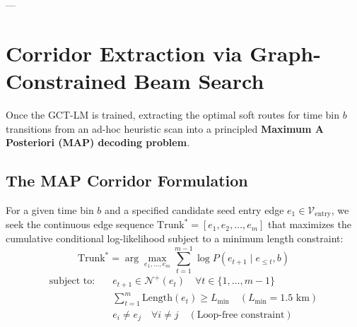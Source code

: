 \documentclass[12pt,a4paper]{article}
\begin{document}
---

\section{Corridor Extraction via Graph-Constrained Beam Search}

Once the GCT-LM is trained, extracting the optimal soft routes for time bin $b$ transitions from an ad-hoc heuristic scan into a principled \textbf{Maximum A Posteriori (MAP) decoding problem}.

\subsection{The MAP Corridor Formulation}
For a given time bin $b$ and a specified candidate seed entry edge $e_1 \in \mathcal{V}_{\text{entry}}$, we seek the continuous edge sequence $\text{Trunk}^* = [e_1, e_2, \dots, e_m]$ that maximizes the cumulative conditional log-likelihood subject to a minimum length constraint:
\begin{equation}
\text{Trunk}^* = \arg\max_{e_1, \dots, e_m} \sum_{t=1}^{m-1} \log P(e_{t+1} \mid e_{\le t}, b)
\end{equation}
\begin{align}
\text{subject to:} \quad & e_{t+1} \in \mathcal{N}^+(e_t) \quad \forall t \in \{1, \dots, m-1\} \\
& \sum_{t=1}^m \text{Length}(e_t) \ge L_{\min} \quad (L_{\min} = 1.5\text{ km}) \\
& e_i \ne e_j \quad \forall i \ne j \quad (\text{Loop-free constraint})
\end{align}
\end{document}
